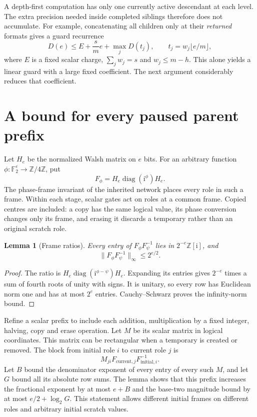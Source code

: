 \documentclass[11pt]{article}
\newtheorem{lemma}{Lemma}
\newcommand{\ii}{\mathrm i}
\newcommand{\Z}{\mathbb Z}
\begin{document}
A depth-first computation has only one currently active descendant at each
level. The extra precision needed inside completed siblings therefore does
not accumulate. For example, concatenating all children only at their
\emph{returned} formats gives a guard recurrence
\[
 D(e)\le E+\frac{s}{m}e+\max_j D(t_j),\qquad
 t_j=w_j\lfloor e/m\rfloor,
\]
where $E$ is a fixed scalar charge, $\sum_jw_j=s$ and
$w_j\le m-h$. This alone yields a linear guard with a large fixed
coefficient. The next argument considerably reduces that coefficient.

\section{A bound for every paused parent prefix}
Let $H_e$ be the normalized Walsh matrix on $e$ bits. For an arbitrary
function $\phi:\mathbb F_2^e\to\Z/4\Z$, put
\[
 F_\phi=H_e\operatorname{diag}(\ii^{\phi})H_e.
\]
The phase-frame invariant of the inherited network places every role in such
a frame. Within each stage, scalar gates act on roles at a common frame. Copied centres are
included: a copy has the same logical value, its phase conversion changes
only its frame, and erasing it discards a temporary rather than an original
scratch role.

\begin{lemma}[Frame ratios]
Every entry of $F_\phi F_\psi^{-1}$ lies in $2^{-e}\Z[\ii]$, and
\[
               \|F_\phi F_\psi^{-1}\|_\infty\le 2^{e/2}.
\]
\end{lemma}
\begin{proof}
The ratio is $H_e\operatorname{diag}(\ii^{\phi-\psi})H_e$.
Expanding its entries gives $2^{-e}$ times a sum of fourth roots of unity
with signs. It is unitary, so every row has Euclidean norm one and has
at most $2^e$ entries. Cauchy--Schwarz proves the infinity-norm bound.
\end{proof}

Refine a scalar prefix to include each addition, multiplication by a fixed
integer, halving, copy and erase operation. Let $M$ be its scalar matrix
in logical coordinates. This matrix can be rectangular when a temporary is
created or removed. The block from initial role $i$ to current role $j$ is
\[
                 M_{ji}F_{\mathrm{current},j}F_{\mathrm{initial},i}^{-1}.
\]
Let $B$ bound the denominator exponent of every entry of every such $M$,
and let $G$ bound all its absolute row sums. The lemma shows that this
prefix increases the fractional exponent by at most $e+B$ and the
base-two magnitude bound by at most $e/2+\log_2G$.
This statement allows different initial frames on different roles and
arbitrary initial scratch values.
\end{document}
